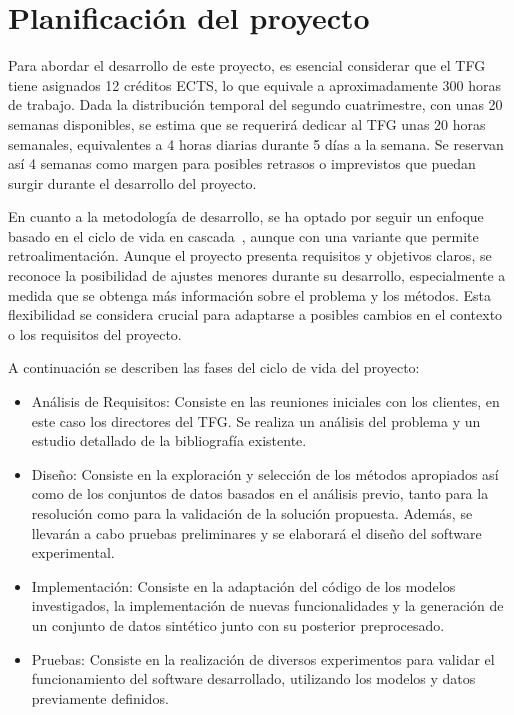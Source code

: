 \section{Planificación del proyecto}

Para abordar el desarrollo de este proyecto, es esencial considerar que el TFG tiene asignados 12 créditos ECTS, lo que equivale a aproximadamente 300 horas de trabajo. Dada la distribución temporal del segundo cuatrimestre, con unas 20 semanas disponibles, se estima que se requerirá dedicar al TFG unas 20 horas semanales, equivalentes a 4 horas diarias durante 5 días a la semana. Se reservan así 4 semanas como margen para posibles retrasos o imprevistos que puedan surgir durante el desarrollo del proyecto.

En cuanto a la metodología de desarrollo, se ha optado por seguir un enfoque basado en el ciclo de vida en cascada~\cite{38}, aunque con una variante que permite retroalimentación. Aunque el proyecto presenta requisitos y objetivos claros, se reconoce la posibilidad de ajustes menores durante su desarrollo, especialmente a medida que se obtenga más información sobre el problema y los métodos. Esta flexibilidad se considera crucial para adaptarse a posibles cambios en el contexto o los requisitos del proyecto.

A continuación se describen las fases del ciclo de vida del proyecto:
\begin{itemize}
	\item Análisis de Requisitos: Consiste en las reuniones iniciales con los clientes, en este caso los directores del TFG. Se realiza un análisis del problema y un estudio detallado de la bibliografía existente.
	\item Diseño: Consiste en la exploración y selección de los métodos apropiados así como de los conjuntos de datos basados en el análisis previo, tanto para la resolución como para la validación de la solución propuesta. Además, se llevarán a cabo pruebas preliminares y se elaborará el diseño del software experimental.
	\item Implementación: Consiste en la adaptación del código de los modelos investigados, la implementación de nuevas funcionalidades y la generación de un conjunto de datos sintético junto con su posterior preprocesado.
	\item Pruebas: Consiste en la realización de diversos experimentos para validar el funcionamiento del software desarrollado, utilizando los modelos y datos previamente definidos.
\end{itemize}

